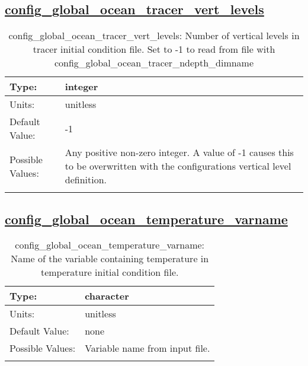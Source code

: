\subsection[config\_global\_ocean\_tracer\_vert\_levels]{\hyperref[sec:nm_tab_global_ocean]{config\_global\_ocean\_tracer\_vert\_levels}}
\label{subsec:nm_sec_config_global_ocean_tracer_vert_levels}
\begin{center}
\begin{longtable}{| p{2.0in} || p{4.0in} |}
    \hline
    Type: & integer \\
    \hline
    Units: & \si{unitless} \\
    \hline
    Default Value: & -1 \\
    \hline
    Possible Values: & Any positive non-zero integer. A value of -1 causes this to be overwritten with the configurations vertical level definition. \\
    \hline
    \caption{config\_global\_ocean\_tracer\_vert\_levels: Number of vertical levels in tracer initial condition file.  Set to -1 to read from file with config\_global\_ocean\_tracer\_ndepth\_dimname}
\end{longtable}
\end{center}
\subsection[config\_global\_ocean\_temperature\_varname]{\hyperref[sec:nm_tab_global_ocean]{config\_global\_ocean\_temperature\_varname}}
\label{subsec:nm_sec_config_global_ocean_temperature_varname}
\begin{center}
\begin{longtable}{| p{2.0in} || p{4.0in} |}
    \hline
    Type: & character \\
    \hline
    Units: & \si{unitless} \\
    \hline
    Default Value: & none \\
    \hline
    Possible Values: & Variable name from input file. \\
    \hline
    \caption{config\_global\_ocean\_temperature\_varname: Name of the variable containing temperature in temperature initial condition file.}
\end{longtable}
\end{center}
